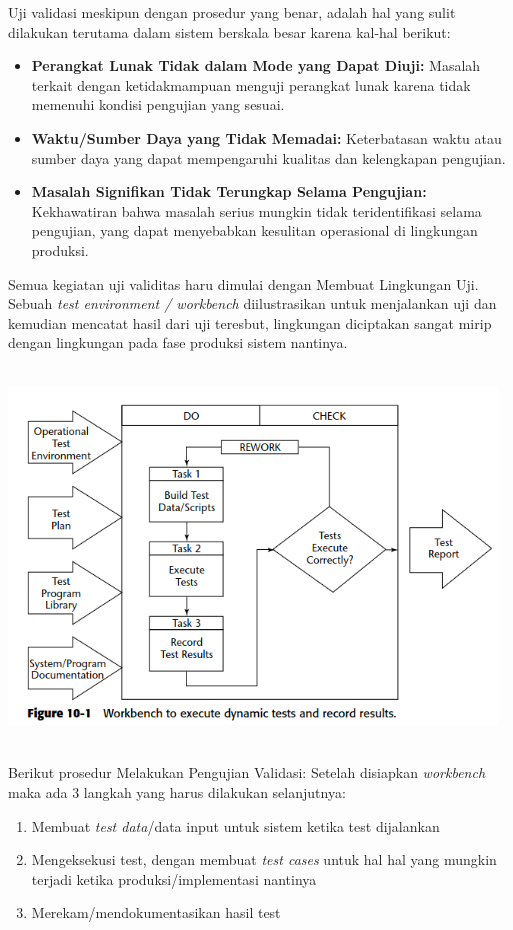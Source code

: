 \documentclass[12pt]{article}
\begin{document}
Uji validasi meskipun dengan prosedur yang benar, adalah hal yang sulit dilakukan terutama dalam sistem berskala besar karena kal-hal berikut:
\begin{itemize}
   \item   \textbf{Perangkat Lunak Tidak dalam Mode yang Dapat Diuji:}
         Masalah terkait dengan ketidakmampuan menguji perangkat lunak karena tidak memenuhi kondisi pengujian yang sesuai.
   \item \textbf{Waktu/Sumber Daya yang Tidak Memadai:}
         Keterbatasan waktu atau sumber daya yang dapat mempengaruhi kualitas dan kelengkapan pengujian.
   \item  \textbf{Masalah Signifikan Tidak Terungkap Selama Pengujian:}
         Kekhawatiran bahwa masalah serius mungkin tidak teridentifikasi selama pengujian, yang dapat menyebabkan kesulitan operasional di lingkungan produksi.
\end{itemize}

Semua kegiatan uji validitas haru dimulai dengan Membuat Lingkungan Uji. Sebuah \emph{test environment / workbench} diilustrasikan untuk menjalankan uji dan kemudian mencatat hasil dari uji teresbut, lingkungan diciptakan  sangat  mirip dengan lingkungan pada fase produksi sistem nantinya.
\begin{center}
   \includegraphics[width=13cm, height=10cm]{images/workbench.png}
\end{center}


Berikut prosedur Melakukan Pengujian Validasi:
Setelah disiapkan \emph{workbench} maka ada 3 langkah yang harus dilakukan selanjutnya:
\begin{enumerate}
   \item Membuat \emph{test data}/data input untuk sistem ketika test dijalankan
   \item Mengeksekusi test, dengan membuat \emph{test cases} untuk hal hal yang mungkin terjadi ketika produksi/implementasi nantinya
   \item Merekam/mendokumentasikan hasil test
\end{enumerate}
\end{document}
